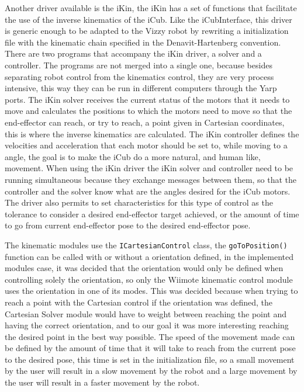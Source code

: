 	Another driver available is the iKin, the iKin has a set of functions that facilitate the use of the inverse kinematics of the iCub. Like the iCubInterface, this driver is generic enough to be adapted to the Vizzy robot by rewriting a initialization file with the kinematic chain specified in the Denavit-Hartenberg convention. There are two programs that accompany the iKin driver, a solver and a controller. The programs are not merged into a single one, because besides separating robot control from the kinematics control, they are very process intensive, this way they can be run in different computers through the Yarp ports. The iKin solver receives the current status of the motors that it needs to move and calculates the positions to which the motors need to move so that the end-effector can reach, or try to reach, a point given in Cartesian coordinates, this is where the inverse kinematics are calculated. The iKin controller defines the velocities and acceleration that each motor should be set to, while moving to a angle, the goal is to make the iCub do a more natural, and human like, movement. When using the iKin driver the iKin solver and controller need to be running simultaneous because they exchange messages between them, so that the controller and the solver know what are the angles desired for the iCub motors. The driver also permits to set characteristics for this type of control as the tolerance to consider a desired end-effector target achieved, or the amount of time to go from current end-effector pose to the desired end-effector pose.
	
	The kinematic modules use the \texttt{ICartesianControl} class, the \texttt{goToPosition()} function can be called with or without a orientation defined, in the implemented modules case, it was decided that the orientation would only be defined when controlling solely the orientation, so only the \ac{Wiimote} kinematic control module uses the orientation in one of its modes. This was decided because when trying to reach a point with the Cartesian control if the orientation was defined, the Cartesian Solver module would have to weight between reaching the point and having the correct orientation, and to our goal it was more interesting reaching the desired point in the best way possible. The speed of the movement made can be defined by the amount of time that it will take to reach from the current pose to the desired pose, this time is set in the initialization file, so a small movement by the user will result in a slow movement by the robot and a large movement by the user will result in a faster movement by the robot.
	
